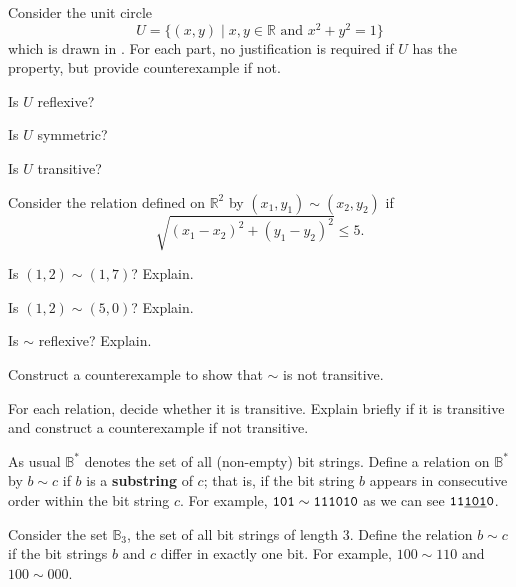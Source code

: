 \begin{exer}[\exerU] %
\label{exer_ppty_rel_unit_circle}
    Consider the unit circle 
        $$U=\{(x,y) \mid x, y \in \mathbb{R} \text{ and } x^2+y^2=1\}$$
    which is drawn in .  For each part, no justification is required if $U$ has the property, but provide counterexample if not. 
        \begin{exerpart}
            \item Is $U$ reflexive?
            \item Is $U$ symmetric?
            \item Is $U$ transitive?
        \end{exerpart}
\end{exer}

\begin{exer}[\exerU] %
\label{exer_ppty_distance_le5}
    Consider the relation defined on $\mathbb{R}^2$ by $(x_1,y_1) \sim (x_2,y_2)$ if $$\sqrt{(x_1-x_2)^2 + (y_1-y_2)^2} \le 5.$$
        \begin{exerpart}
            \item Is $(1,2) \sim (1,7)$? Explain.
            \item Is $(1,2) \sim (5,0)$? Explain.
            \item Is $\sim$ reflexive?  Explain.
            \item Construct a counterexample to show that $\sim$ is not transitive.
        \end{exerpart}
\end{exer}

\begin{exer}[\exerU] %
\label{exer_ppty_rel_bs}
   For each relation, decide whether it is transitive.  Explain briefly if it is transitive and construct a counterexample if not transitive.
    \begin{exerpart}
        \item As usual $\mathbb{B}^*$ denotes the set of all (non-empty) bit strings. Define a relation on $\mathbb{B}^*$ by $b \sim c$ if $b$ is a \textbf{substring} of $c$; that is, if the bit string $b$ appears in consecutive order within the bit string $c$.  For example, $\texttt{101} \sim \texttt{111010}$ as we can see $\texttt{11}\underline{\texttt{101}}\texttt{0}$. 
        \item Consider the set $\mathbb{B}_3$, the set of all bit strings of length 3.  Define the relation $b \sim c$ if the bit strings $b$ and $c$ differ in exactly one bit.  For example, $100 \sim 110$ and $100 \sim 000$.
    \end{exerpart}
\end{exer}

